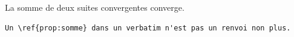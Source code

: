 \begin{proposition}[label=prop:somme] %
  La somme de deux suites convergentes converge.
\end{proposition}

\begin{verbatim}
Un \ref{prop:somme} dans un verbatim n'est pas un renvoi non plus.
\end{verbatim}
